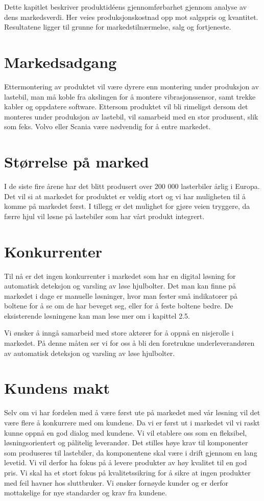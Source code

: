 Dette kapitlet beskriver produktidéens gjennomførbarhet gjennom analyse av 
dens markedsverdi. Her veies produksjonskostnad opp mot salgspris og kvantitet.
Resultatene ligger til grunne for markedstilnærmelse, salg og fortjeneste.

\section{Markedsadgang}
Ettermontering av produktet vil være dyrere enn montering under produksjon av 
lastebil, man må koble fra akslingen for å montere vibrasjonssensor, samt 
trekke kabler og oppdatere software. Ettersom produktet vil bli rimeligst 
dersom det monteres under produksjon av lastebil, vil  samarbeid med en stor 
produsent, slik som feks. Volvo eller Scania være nødvendig for å entre markedet. 

\section{Størrelse på marked}
I de siste fire årene har det blitt produsert over 200 000 lasterbiler årlig 
i Europa\cite{lastebilprod-DAF}. Det vil si at markedet for produktet er 
veldig stort og vi har muligheten til å komme på markedet først. I tillegg er 
det mulighet for gjøre veien tryggere, da færre hjul vil løsne på lastebiler 
som har vårt produkt integrert.

\section{Konkurrenter}
Til nå er det ingen konkurrenter i markedet som har en digital løsning for 
automatisk deteksjon og varsling av løse hjulbolter. Det man kan finne på 
markedet i dage er manuelle løsninger, hvor man fester små indikatorer på 
boltene for å se om de har beveget seg, eller for å feste boltene bedre. De 
eksisterende løsningene kan man lese mer om i kapittel 2.5.

Vi ønsker å inngå samarbeid med store aktører for å oppnå en nisjerolle i 
markedet. På denne måten ser vi for oss å bli den foretrukne 
underleverandøren av automatisk deteksjon og varsling av løse hjulbolter.

\section{Kundens makt}
Selv om vi har fordelen med å være først ute på markedet med vår løsning vil 
det være flere å konkurrere med om kundene. Da vi er først ut i markedet vil 
vi raskt kunne oppnå en god dialog med kundene. Vi vil etablere oss som en 
fleksibel, løsningsorientert og pålitelig leverandør. Det stilles høye krav 
til komponenter som produseres til lastebiler, da komponentene skal være i 
drift gjennom en lang levetid. Vi vil derfor ha fokus på å levere produkter 
av høy kvalitet til en god pris. Vi skal ha et stort fokus på 
kvalitetssikring for å sikre at ingen produkter med feil havner hos 
sluttbruker. Vi ønsker fornøyde kunder og er derfor mottakelige for nye 
standarder og krav fra kundene. 


